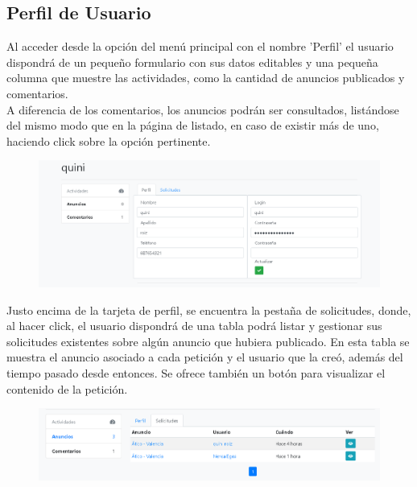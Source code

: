 \subsection{Perfil de Usuario}

Al acceder desde la opci\'{o}n del men\'{u} principal con el nombre 'Perfil' el usuario dispondr\'{a} de un peque\~{n}o formulario con sus datos editables y una peque\~{n}a columna que muestre las actividades, como la cantidad de anuncios publicados y comentarios. \\

A diferencia de los comentarios, los anuncios podr\'{a}n  ser consultados, list\'{a}ndose del mismo modo que en la p\'{a}gina de listado, en caso de existir m\'{a}s de uno, haciendo click sobre la opci\'{o}n pertinente. 


\begin{figure}[h!]
\centering
\includegraphics[width=.9\textwidth]{Img/ManualUsuario/USER_PROFILE_EDIT.png}
\end{figure}

Justo encima de la tarjeta de perfil, se encuentra la pesta\~{n}a de solicitudes, donde, al hacer click,  el usuario dispondr\'{a} de una tabla  podr\'{a} listar y gestionar sus solicitudes existentes sobre alg\'{u}n anuncio que hubiera publicado. En esta tabla se muestra el anuncio asociado a cada petici\'{o}n y el usuario que la cre\'{o}, adem\'{a}s del tiempo pasado desde entonces. Se ofrece tambi\'{e}n un bot\'{o}n para visualizar el contenido de la petici\'{o}n.

\begin{figure}[h!]
\centering
\includegraphics[width=1\textwidth]{Img/ManualUsuario/USER_REQUESTS.png}
\end{figure}

